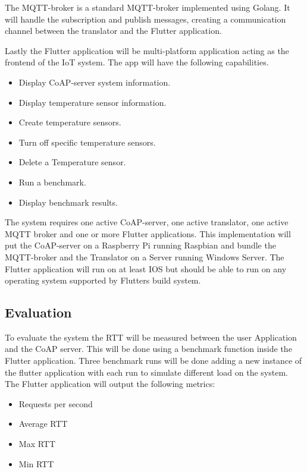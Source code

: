 The MQTT-broker is a standard MQTT-broker implemented using Golang. It will handle the subscription and publish messages, creating a communication channel between the translator and the Flutter application.

Lastly the Flutter application will be multi-platform application acting as the frontend of the IoT system. The app will have the following capabilities. 
\begin{itemize}
    \item Display CoAP-server system information.
    \item Display temperature sensor information.
    \item Create temperature sensors.
    \item Turn off specific temperature sensors.
    \item Delete a Temperature sensor.
    \item Run a benchmark.
    \item Display benchmark results.
\end{itemize}

The system requires one active CoAP-server, one active translator, one active MQTT broker and one or more Flutter applications. This implementation will put the CoAP-server on a Raspberry Pi running Raspbian and bundle the MQTT-broker and the Translator on a Server running Windows Server. The Flutter application will run on at least IOS but should be able to run on any operating system supported by Flutters build system.

\subsection{Evaluation}
To evaluate the system the RTT will be measured between the user Application and the CoAP server. This will be done using a benchmark function inside the Flutter application. Three benchmark runs will be done adding a new instance of the flutter application with each run to simulate different load on the system. The Flutter application will output the following metrics:
\begin{itemize}
    \item Requests per second
    \item Average RTT
    \item Max RTT
    \item Min RTT
\end{itemize}



